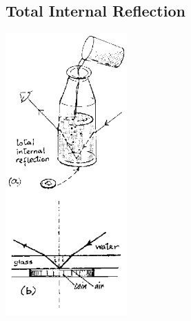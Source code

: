 \begin{multicols}{2}
\columnbreak

%
%

\subsection{Total Internal Reflection}

\begin{center}
\includegraphics[width=0.35\textwidth]{./img/source/total-int-refl.png}
\end{center}


\end{multicols}
